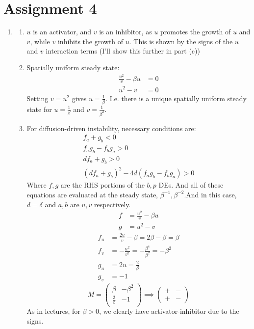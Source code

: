 \documentclass{X:/Documents/Coding/Latex/myassignment}
\begin{document}
\clearpage
\section{Assignment 4}

\begin{enumerate}
	\item 
	\begin{enumerate}
		\item $u$ is an activator, and $v$ is an inhibitor, as $u$ promotes the growth of $u$ and $v$, while $v$ inhibits the growth of $u$. This is shown by the signs of the $u$ and $v$ interaction terms (I'll show this further in part (c))
		\item Spatially uniform steady state:
		\begin{align*}
			\frac{u^2}{v} - \beta u &= 0\\
			u^2 - v &= 0
		\end{align*}
		Setting $v = u^2$ gives $u = \frac{1}{\beta}$. I.e. there is a unique spatially uniform steady state for $u = \frac{1}{\beta}$ and $v = \frac{1}{\beta^2}$.
		\item
		

		For diffusion-driven instability, necessary conditions are:
		\begin{align*}
			f_a + g_b < 0\\
			f_a g_b - f_b g_a > 0\\
			d f_a + g_b > 0\\
			(df_a + g_b)^2 - 4 d(f_a g_b - f_b g_a) > 0
		\end{align*}
		Where $f,g$ are the RHS portions of the $b,p$ DEs. And all of these equations are evaluated at the steady state, $\beta^{-1}, \beta^{-2}$.And in this case, $d = \delta$ and $a, b$ are $u, v$ respectively.
		\begin{align*}
			f &= \frac{u^2}{v} - \beta u\\
			g &= u^2 - v
		\end{align*}
		\begin{align*}
			f_u &= \frac{2u}{v} - \beta = 2 \beta - \beta = \beta\\
			f_v &= -\frac{u^2}{v^2} = -\frac{\beta^4}{\beta^2} = - \beta ^2\\
			g_u &= 2u = \frac{2}{\beta}\\
			g_v &= -1
		\end{align*}
		\[M = \begin{pmatrix}
			\beta & - \beta^2\\
			\frac{2}{\beta} & -1
		\end{pmatrix} \implies \begin{pmatrix}
			+&-\\+&-
		\end{pmatrix}\]
		As in lectures, for $\beta > 0$, we clearly have activator-inhibitor due to the signs.



\end{enumerate}
\end{enumerate}
\end{document}
